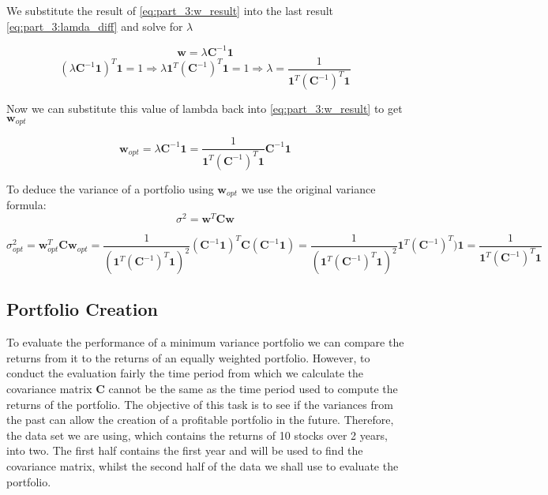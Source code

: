 We substitute the result of \autoref{eq:part_3:w_result} into the last result \autoref{eq:part_3:lamda_diff} and solve for $\lambda$

\begin{equation}
    \mathbf{w} = \lambda\mathbf{C}^{-1}\mathbf{1}
\end{equation}   
\begin{equation}
    (\lambda\mathbf{C}^{-1}\mathbf{1})^T\mathbf{1} = 1 \Rightarrow \lambda\mathbf{1}^T(\mathbf{C}^{-1})^T\mathbf{1} = 1 \Rightarrow \lambda = \frac{1}{\mathbf{1}^T(\mathbf{C}^{-1})^T\mathbf{1}}
\end{equation} 

Now we can substitute this value of lambda back into \autoref{eq:part_3:w_result} to get $\mathbf{w}_{opt}$

\begin{equation}
    \mathbf{w}_{opt} = \lambda\mathbf{C}^{-1}\mathbf{1} = \frac{1}{\mathbf{1}^T(\mathbf{C}^{-1})^T\mathbf{1}}\mathbf{C}^{-1}\mathbf{1}
\end{equation} 

To deduce the variance of a portfolio using $\mathbf{w}_{opt}$ we use the original variance formula: \[\sigma^2 = \mathbf{w}^T\mathbf{C}\mathbf{w}\] 

\[\sigma_{opt}^2 = \mathbf{w}_{opt}^T\mathbf{C}\mathbf{w}_{opt} = \frac{1}{(\mathbf{1}^T(\mathbf{C}^{-1})^T\mathbf{1})^2}(\mathbf{C}^{-1}\mathbf{1})^T\mathbf{C}(\mathbf{C}^{-1}\mathbf{1}) = \frac{1}{(\mathbf{1}^T(\mathbf{C}^{-1})^T\mathbf{1})^2}\mathbf{1}^T(\mathbf{C}^{-1})^T)\mathbf{1} = \frac{1}{\mathbf{1}^T(\mathbf{C}^{-1})^T\mathbf{1}} \]

\subsection{Portfolio Creation}

To evaluate the performance of a minimum variance portfolio we can compare the returns from it to the returns of an equally weighted portfolio. However, to conduct the evaluation fairly the time period from which we calculate the covariance matrix $\mathbf{C}$ cannot be the same as the time period used to compute the returns of the portfolio. The objective of this task is to see if the variances from the past can allow the creation of a profitable portfolio in the future. Therefore, the data set we are using, which contains the returns of 10 stocks over 2 years, into two. The first half contains the first year and will be used to find the covariance matrix, whilst the second half of the data we shall use to evaluate the portfolio.

